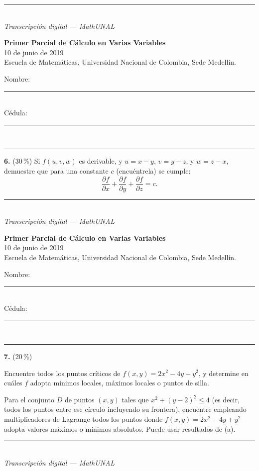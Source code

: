 \documentclass[11pt]{article}
\newcommand{\examheader}{%
  \noindent
  \begin{minipage}[t]{0.62\linewidth}
    {\bfseries\large Primer Parcial de C\'alculo en Varias Variables}\\
    {\small 10 de junio de 2019}\\
    {\small Escuela de Matem\'aticas, Universidad Nacional de Colombia, Sede Medell\'in.}
  \end{minipage}%
  \hfill
  \begin{minipage}[t]{0.33\linewidth}
    \raggedleft\small
    Nombre: \rule{2.8cm}{0.4pt}\\[4pt]
    C\'edula: \rule{2.8cm}{0.4pt}
  \end{minipage}\\[4pt]
  \rule{\linewidth}{0.6pt}
}
\newcommand{\examfooter}{%
  \vfill
  \rule{\linewidth}{0.4pt}\\[1pt]
  {\scriptsize\textit{Transcripci\'on digital --- MathUNAL}\hfill\textcolor{unalblue}{\textbf{\thepage}}}
}
\begin{document}
\vfill
\examfooter
\newpage
\examheader
\vspace{2pt}

\noindent\textbf{6.} (30\,\%) Si $f(u,v,w)$ es derivable, y $u=x-y$, $v=y-z$, y $w=z-x$, demuestre que para una constante $c$ (encu\'entrela) se cumple:
$$\frac{\partial f}{\partial x} + \frac{\partial f}{\partial y} + \frac{\partial f}{\partial z} = c.$$

\vfill
\examfooter
\newpage
\examheader
\vspace{2pt}

\noindent\textbf{7.} (20\,\%)
\begin{opciones}
  \item[(a)] [10\,\%] Encuentre todos los puntos cr\'iticos de $f(x,y)=2x^2-4y+y^2$, y determine en cu\'ales $f$ adopta m\'inimos locales, m\'aximos locales o puntos de silla.
  \item[(b)] [10\,\%] Para el conjunto $D$ de puntos $(x,y)$ tales que $x^2+(y-2)^2\leq 4$ (es decir, todos los puntos entre ese c\'irculo incluyendo su frontera), encuentre empleando multiplicadores de Lagrange todos los puntos donde $f(x,y)=2x^2-4y+y^2$ adopta valores m\'aximos o m\'inimos absolutos. Puede usar resultados de (a).
\end{opciones}

\vfill
\examfooter
\end{document}

